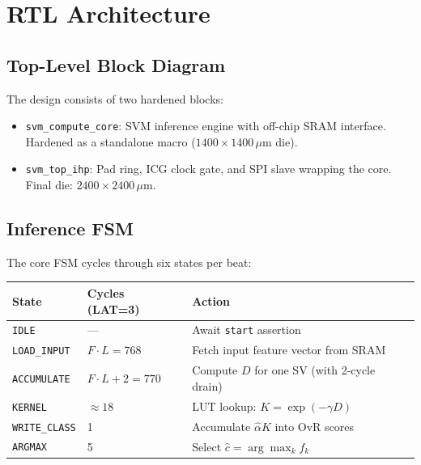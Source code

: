 \documentclass[11pt]{article}
\newcommand{\um}{\,\mu\mathrm{m}}
\begin{document}
\section{RTL Architecture}

\subsection{Top-Level Block Diagram}

The design consists of two hardened blocks:

\begin{itemize}[noitemsep]
  \item \texttt{svm\_compute\_core}: SVM inference engine with off-chip SRAM
        interface.  Hardened as a standalone macro ($1400\times1400\um$ die).
  \item \texttt{svm\_top\_ihp}: Pad ring, ICG clock gate, and SPI slave wrapping
        the core.  Final die: $2400\times2400\um$.
\end{itemize}

\subsection{Inference FSM}

The core FSM cycles through six states per beat:

\begin{center}
\begin{tabular}{lll}
\toprule
State & Cycles (LAT=3) & Action \\
\midrule
\texttt{IDLE}         & ---         & Await \texttt{start} assertion \\
\texttt{LOAD\_INPUT}  & $F \cdot L = 768$   & Fetch input feature vector from SRAM \\
\texttt{ACCUMULATE}   & $F \cdot L + 2 = 770$ & Compute $D$ for one SV (with 2-cycle drain) \\
\texttt{KERNEL}       & $\approx 18$        & LUT lookup: $K = \exp(-\gamma D)$ \\
\texttt{WRITE\_CLASS} & 1                   & Accumulate $\hat\alpha K$ into OvR scores \\
\texttt{ARGMAX}       & 5                   & Select $\hat c = \arg\max_k f_k$ \\
\bottomrule
\end{tabular}
\end{center}
\end{document}
